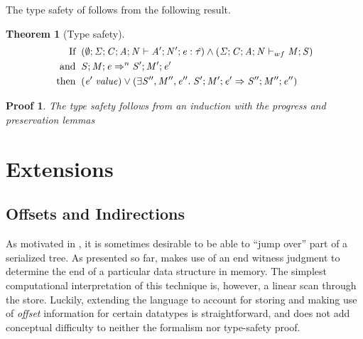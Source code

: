 \documentclass[showabstract,showacknowledgments,showpreface,showdedication]{iuphd}
\newtheorem{theorem}{Theorem}[section]
\theoremstyle{nonumberplain}
\newtheorem{nproof}{Proof}
\begin{document}
The type safety of \ourcalc{} follows from the following result.

\begin{theorem}[Type safety]
  \label{theorem:type-safety}
\begin{displaymath}
  \begin{aligned}
  \text{If} \;\; & (\emptyset;\mathit{\Sigma};\mathit{C};\mathit{A};\mathit{N} \vdash \mathit{A}';\mathit{N}';\mathit{e} : \mathit{\hat{\tau}}) \wedge
                   (\mathit{\Sigma};\mathit{C};\mathit{A};\mathit{N} \vdash_{wf} \mathit{M};\mathit{S}) \\
  \text{and} \;\; & \mathit{S};\mathit{M};\mathit{e} \Rightarrow^n \mathit{S}';\mathit{M}';\mathit{e}' \\
  \text{then} \;\; & (\mathit{e}' \; \mathit{value}) \vee 
                     (\exists \mathit{S}'', \mathit{M}'', \mathit{e}'' . \; \mathit{S}';\mathit{M}';\mathit{e}' \Rightarrow \mathit{S}'';\mathit{M}'';\mathit{e}'')
  \end{aligned}
  \end{displaymath}  
\end{theorem}

\begin{nproof}
  The type safety follows from an induction with
  the progress and preservation lemmas 
\end{nproof}

\section{Extensions}\label{sec:extensions}


\subsection{Offsets and Indirections}\label{subsec:indirections}

As motivated in , it is sometimes desirable to be
able to ``jump over'' part of a serialized tree.
%
As presented so far, \ourcalc{} makes use of an end witness judgment
to determine the end of a particular data structure in memory.
%
The simplest computational interpretation of this technique is,
however, a linear scan through the store.
%
Luckily, extending the language to account for storing and making use
of \emph{offset} information for certain datatypes is
straightforward, and does not add conceptual difficulty to
neither the formalism nor type-safety proof.
\end{document}
